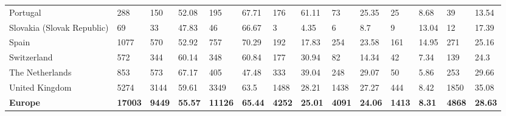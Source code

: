 \begin{tabular}{llllllllllllll}
  Portugal & 288 & 150 & 52.08 & 195 & 67.71 & 176 & 61.11 & 73 & 25.35 & 25 & 8.68 & 39 & 13.54 \\ 
  Slovakia (Slovak Republic) & 69 & 33 & 47.83 & 46 & 66.67 & 3 & 4.35 & 6 & 8.7 & 9 & 13.04 & 12 & 17.39 \\ 
  Spain & 1077 & 570 & 52.92 & 757 & 70.29 & 192 & 17.83 & 254 & 23.58 & 161 & 14.95 & 271 & 25.16 \\ 
  Switzerland & 572 & 344 & 60.14 & 348 & 60.84 & 177 & 30.94 & 82 & 14.34 & 42 & 7.34 & 139 & 24.3 \\ 
  The Netherlands & 853 & 573 & 67.17 & 405 & 47.48 & 333 & 39.04 & 248 & 29.07 & 50 & 5.86 & 253 & 29.66 \\ 
  United Kingdom & 5274 & 3144 & 59.61 & 3349 & 63.5 & 1488 & 28.21 & 1438 & 27.27 & 444 & 8.42 & 1850 & 35.08 \\ 
  \textbf{\textbf{Europe}} & \textbf{17003} & \textbf{9449} & \textbf{55.57} & \textbf{11126} & \textbf{65.44} & \textbf{4252} & \textbf{25.01} & \textbf{4091} & \textbf{24.06} & \textbf{1413} & \textbf{8.31} & \textbf{4868} & \textbf{28.63} \\ 
   \bottomrule
\end{tabular}
